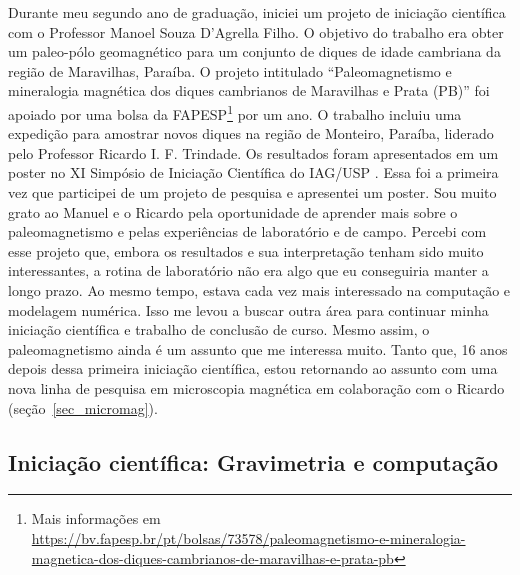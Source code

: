 \documentclass[10pt,a4paper,oneside]{book}
\begin{document}
Durante meu segundo ano de graduação, iniciei um projeto de iniciação
científica com o Professor Manoel Souza D'Agrella Filho.
O objetivo do trabalho era obter um paleo-pólo geomagnético para um conjunto
de diques de idade cambriana da região de Maravilhas, Paraíba.
O projeto intitulado ``Paleomagnetismo e mineralogia magnética dos diques
cambrianos de Maravilhas e Prata (PB)'' foi apoiado por uma bolsa da
FAPESP\footnote{Mais informações em
\url{https://bv.fapesp.br/pt/bolsas/73578/paleomagnetismo-e-mineralogia-magnetica-dos-diques-cambrianos-de-maravilhas-e-prata-pb}}
por um ano.
O trabalho incluiu uma expedição para amostrar novos diques na região de
Monteiro, Paraíba, liderado pelo Professor Ricardo I. F. Trindade.
Os resultados foram apresentados em um poster no XI Simpósio de Iniciação
Científica do IAG/USP \citep{Uieda2006}.
Essa foi a primeira vez que participei de um projeto de pesquisa e apresentei
um poster.
Sou muito grato ao Manuel e o Ricardo pela oportunidade de aprender mais sobre
o paleomagnetismo e pelas experiências de laboratório e de campo.
Percebi com esse projeto que, embora os resultados e sua interpretação tenham
sido muito interessantes, a rotina de laboratório não era algo que eu
conseguiria manter a longo prazo.
Ao mesmo tempo, estava cada vez mais interessado na computação e modelagem
numérica.
Isso me levou a buscar outra área para continuar minha iniciação científica e
trabalho de conclusão de curso.
Mesmo assim, o paleomagnetismo ainda é um assunto que me interessa muito.
Tanto que, 16 anos depois dessa primeira iniciação científica, estou retornando
ao assunto com uma nova linha de pesquisa em microscopia magnética em
colaboração com o Ricardo (seção~\ref{sec_micromag}).

\subsection{Iniciação científica: Gravimetria e computação}
\label{sec_ic_tesseroids}
\end{document}

